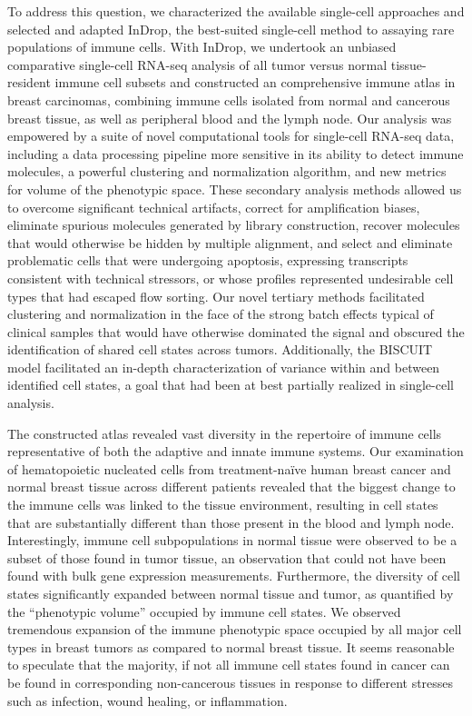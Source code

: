 To address this question, we characterized the available single-cell approaches and selected and adapted InDrop, the best-suited single-cell method to assaying rare populations of immune cells. 
With InDrop, we undertook an unbiased comparative single-cell RNA-seq analysis of all tumor versus normal tissue-resident immune cell subsets and constructed an comprehensive immune atlas in breast carcinomas, combining immune cells isolated from normal and cancerous breast tissue, as well as peripheral blood and the lymph node. 
Our analysis was empowered by a suite of novel computational tools for single-cell RNA-seq data, including a data processing pipeline more sensitive in its ability to detect immune molecules, a powerful clustering and normalization algorithm, and new metrics for volume of the phenotypic space.  
These secondary analysis methods allowed us to overcome significant technical artifacts, correct for amplification biases, eliminate spurious molecules generated by library construction, recover molecules that would otherwise be hidden by multiple alignment, and select and eliminate problematic cells that were undergoing apoptosis, expressing transcripts consistent with technical stressors, or whose profiles represented undesirable cell types that had escaped flow sorting. 
Our novel tertiary methods facilitated clustering and normalization in the face of the strong batch effects typical of clinical samples that would have otherwise dominated the signal and obscured the identification of shared cell states across tumors. 
Additionally, the BISCUIT model facilitated an in-depth characterization of variance within and between identified cell states, a goal that had been at best partially realized in single-cell analysis. 

The constructed atlas revealed vast diversity in the repertoire of immune cells representative of both the adaptive and innate immune systems. 
Our examination of hematopoietic nucleated cells from treatment-naïve human breast cancer and normal breast tissue across different patients revealed that the biggest change to the immune cells was linked to the tissue environment, resulting in cell states that are substantially different than those present in the blood and lymph node. 
Interestingly, immune cell subpopulations in normal tissue were observed to be a subset of those found in tumor tissue, an observation that could not have been found with bulk gene expression measurements. 
Furthermore, the diversity of cell states significantly expanded between normal tissue and tumor, as quantified by the ``phenotypic volume'' occupied by immune cell states. 
We observed tremendous expansion of the immune phenotypic space occupied by all major cell types in breast tumors as compared to normal breast tissue. 
It seems reasonable to speculate that the majority, if not all immune cell states found in cancer can be found in corresponding non-cancerous tissues in response to different stresses such as infection, wound healing, or inflammation.

